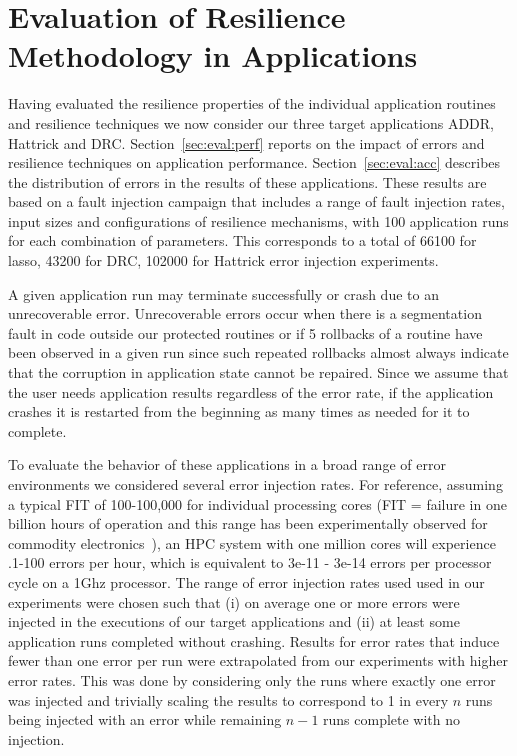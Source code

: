 \documentclass{sig-alternate}
\begin{document}
\section{Evaluation of Resilience Methodology in Applications}
\label{sec:eval}

Having evaluated the resilience properties of the individual application routines and resilience techniques we now consider our three target applications ADDR, Hattrick and DRC.
Section~\ref{sec:eval:perf} reports on the impact of errors and resilience techniques on application performance. Section~\ref{sec:eval:acc} describes the distribution of errors in the results of these applications.
These results are based on a fault injection campaign that includes a range of fault injection rates, input sizes and configurations of resilience mechanisms, with 100 application runs for each combination of parameters.
This corresponds to a total of 66100 for lasso, 43200 for DRC, 102000 for Hattrick error injection experiments.

A given application run may terminate successfully or crash due to an unrecoverable error.
Unrecoverable errors occur when there is a segmentation fault in code outside our protected routines or if 5 rollbacks of a routine have been observed in a given run since such repeated rollbacks almost always indicate that the corruption in application state cannot be repaired.
Since we assume that the user needs application results regardless of the error rate, if the application crashes it is restarted from the beginning as many times as needed for it to complete.

To evaluate the behavior of these applications in a broad range of error environments we considered several error injection rates.
For reference, assuming a typical FIT of 100-100,000 for individual processing cores (FIT = failure in one billion hours of operation and this range has been experimentally observed for commodity electronics~\cite{mem_errors:2010, DRAMerr:2009}), an HPC system with one million cores will experience .1-100 errors per hour, which is equivalent to 3e-11 - 3e-14 errors per processor cycle on a 1Ghz processor.
The range of error injection rates used used in our experiments were chosen such that (i) on average one or more errors were injected in the executions of our target applications and (ii) at least some application runs completed without crashing.
Results for error rates that induce fewer than one error per run were extrapolated from our experiments with higher error rates.
This was done by considering only the runs where exactly one error was injected and trivially scaling the results to correspond to 1 in every $n$ runs being injected with an error while remaining $n-1$ runs complete with no injection.
\end{document}
